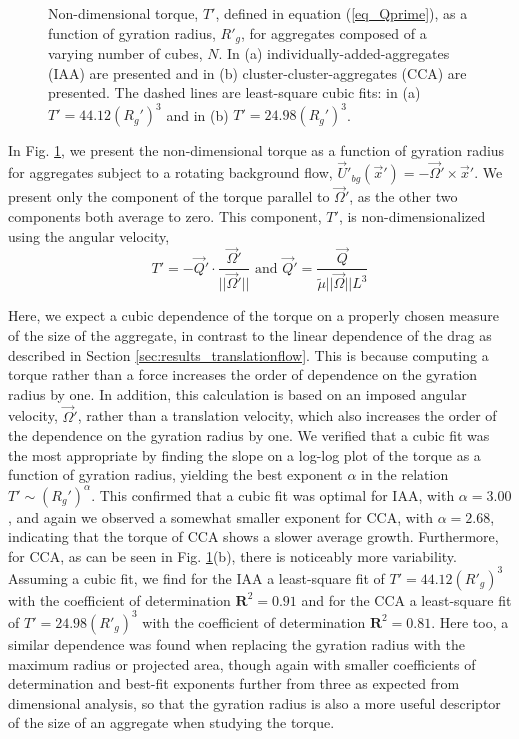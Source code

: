 \begin{figure}[ht]
	\begin{center}
	\end{center}
	\caption{Non-dimensional torque, $T'$, defined in equation (\ref{eq_Qprime}), as a function of gyration radius, $R'_g$, for aggregates composed of a varying number of cubes, $N$. In (a)  individually-added-aggregates (IAA) are presented and in (b) cluster-cluster-aggregates (CCA) are presented.	The dashed lines are least-square cubic fits: in (a) $T' = 44.12 (R_g')^3$ and in (b) $T' = 24.98 (R_g')^3$.}
	\label{fig_torque}
\end{figure}
In Fig. \ref{fig_torque}, we present the non-dimensional torque as a function of gyration radius for aggregates subject to a rotating background flow, $\vec{U}'_{bg}(\vec{x}') = -\vec{\Omega}' \times \vec{x}'$. We present only the component of the torque parallel to $\vec{\Omega}'$, as the other two components both average to zero. This component, $T'$, is non-dimensionalized using the angular velocity, 
\begin{equation}
T' = -\vec{Q}' \cdot \frac{\vec{\Omega}'}{||\vec{\Omega}' ||}  \text{\ \ \ and \ \ \ } \vec{Q}' = \frac{  \vec{Q} } {\tilde{\mu} ||\vec{\Omega}  || L^3 } 
\label{eq_Qprime}
\end{equation}


Here, we expect a cubic dependence of the torque on a properly chosen measure of the size of the aggregate, 
 in contrast to the linear dependence of the drag as described in Section 
\ref{sec:results_translationflow}. 
This is because computing a torque rather than a force increases the order of dependence on the gyration radius by one. In addition, this calculation is based on an imposed angular velocity, $\vec{\Omega}'$, rather than a translation velocity, which also increases the order of the dependence on the gyration radius by one.
We verified that a cubic fit was the most appropriate by finding the slope on a log-log plot of the torque as a function of gyration radius, yielding the best exponent $\alpha$ in the relation $T' \sim (R_g')^\alpha$. This confirmed that a cubic fit was optimal for IAA, with $\alpha=3.00$, and again we observed a somewhat smaller exponent for CCA, with $\alpha=2.68$, indicating that the torque of CCA shows a slower average growth.  Furthermore, for CCA, as can be seen in Fig. \ref{fig_torque}(b), there is noticeably more variability.
Assuming a cubic fit, we find for the IAA a least-square fit of $T' = 44.12 (R'_g)^3$ with the coefficient of determination $\mathbf{R}^2=0.91$ and for the CCA a least-square fit of $T' = 24.98 (R'_g)^3$ with the coefficient of determination $\mathbf{R}^2=0.81$. Here too, a similar dependence was found when replacing the gyration radius with the maximum radius or projected area, though again with smaller coefficients of determination and best-fit exponents further from three as expected from dimensional analysis, so that the gyration radius is also a more useful descriptor of the size of an aggregate when studying the torque.


